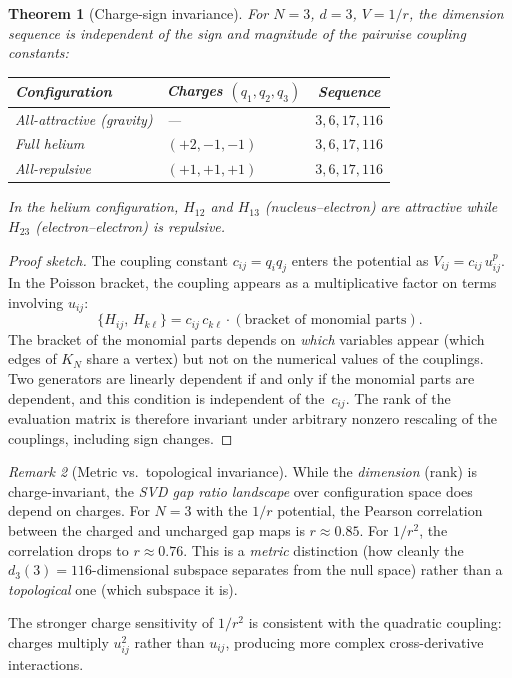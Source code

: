 \documentclass[11pt,a4paper]{article}
\newtheorem{theorem}{Theorem}
\theoremstyle{remark}
\newtheorem{remark}[theorem]{Remark}
\newcommand{\pb}[2]{\{#1,\,#2\}}
\begin{document}
\begin{theorem}[Charge-sign invariance]
\label{thm:charge}
For $N{=}3$, $d{=}3$, $V = 1/r$, the dimension sequence
is independent of the sign and magnitude of the pairwise
coupling constants:
\begin{center}
\begin{tabular}{@{}llc@{}}
\toprule
Configuration & Charges $(q_1, q_2, q_3)$
  & Sequence \\
\midrule
All-attractive (gravity) & ---
  & $3, 6, 17, 116$ \\
Full helium & $(+2, -1, -1)$
  & $3, 6, 17, 116$ \\
All-repulsive & $(+1, +1, +1)$
  & $3, 6, 17, 116$ \\
\bottomrule
\end{tabular}
\end{center}
In the helium configuration, $H_{12}$ and $H_{13}$
(nucleus--electron) are attractive while $H_{23}$
(electron--electron) is repulsive.
\end{theorem}

\begin{proof}[Proof sketch]
The coupling constant $c_{ij} = q_i q_j$ enters the
potential as $V_{ij} = c_{ij}\, u_{ij}^p$.  In the
Poisson bracket, the coupling appears as a multiplicative
factor on terms involving $u_{ij}$:
\[
  \pb{H_{ij}}{H_{k\ell}} = c_{ij}\, c_{k\ell}
    \cdot (\text{bracket of monomial parts}).
\]
The bracket of the monomial parts depends on
\emph{which} variables appear (which edges of $K_N$
share a vertex) but not on the numerical values of the
couplings.  Two generators are linearly dependent if and
only if the monomial parts are dependent, and this
condition is independent of the~$c_{ij}$.  The rank of
the evaluation matrix is therefore invariant under
arbitrary nonzero rescaling of the couplings, including
sign changes.
\end{proof}

\begin{remark}[Metric vs.\ topological invariance]
\label{rem:metric}
While the \emph{dimension} (rank) is charge-invariant,
the \emph{SVD gap ratio landscape} over configuration
space does depend on charges.  For $N{=}3$ with the
$1/r$ potential, the Pearson correlation between the
charged and uncharged gap maps is $r \approx 0.85$.
For $1/r^2$, the correlation drops to $r \approx 0.76$.
This is a \emph{metric} distinction (how cleanly the
$d_3(3) = 116$-dimensional subspace separates from the
null space) rather than a \emph{topological} one (which
subspace it is).

The stronger charge sensitivity of $1/r^2$ is consistent
with the quadratic coupling: charges multiply $u_{ij}^2$
rather than $u_{ij}$, producing more complex
cross-derivative interactions.
\end{remark}
\end{document}
